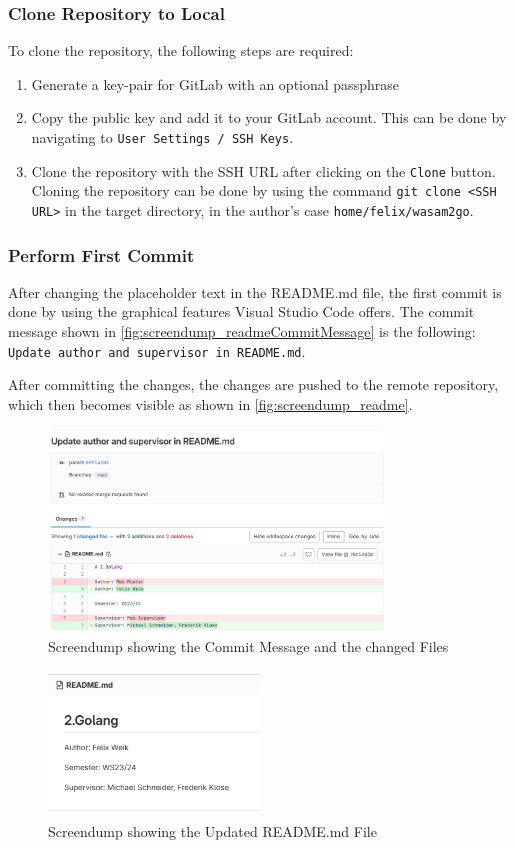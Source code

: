 \subsubsection*{Clone Repository to Local}
To clone the repository, the following steps are required:
\begin{enumerate}
    \item Generate a key-pair for GitLab with an optional passphrase
    \item Copy the public key and add it to your GitLab account.
    This can be done by navigating to \texttt{User Settings / SSH Keys}.
    \item Clone the repository with the SSH URL after clicking on the \texttt{Clone} button.
    Cloning the repository can be done by using the command \texttt{git clone <SSH URL>} in the target directory, in the author's case \texttt{home/felix/wasam2go}.
\end{enumerate}

\subsubsection*{Perform First Commit}
After changing the placeholder text in the README.md file, the first commit is done by using the graphical features Visual Studio Code offers.
The commit message shown in \autoref{fig:screendump_readmeCommitMessage} is the following: \texttt{Update author and supervisor in README.md}.

After committing the changes, the changes are pushed to the remote repository, which then becomes visible as shown in \autoref{fig:screendump_readme}.

\begin{figure}
    \centering
    \includegraphics[width=0.8\textwidth]{figures/goLang/golang_screendumpReadmeCommit.png}
    \caption{Screendump showing the Commit Message and the changed Files}
    \label{fig:screendump_readmeCommitMessage}
\end{figure}

\begin{figure}
    \centering
    \includegraphics[width=0.5\textwidth]{figures/goLang/golang_screendumpReadme.png}
    \caption{Screendump showing the Updated README.md File}
    \label{fig:screendump_readme}
\end{figure}
